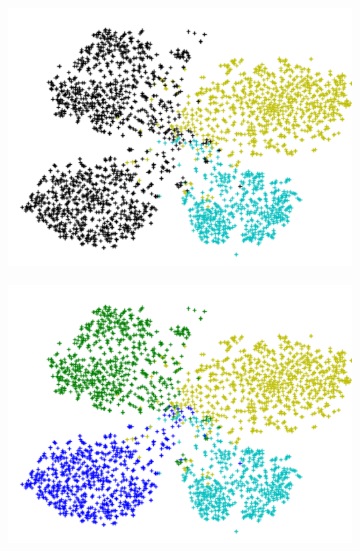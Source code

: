 \begin{figure}[t]
  \centering
  \begin{subfigure}[b]{0.27\linewidth}
    \includegraphics[width=\linewidth]{images/none}
    \caption{}
    \label{fig:null}
  \end{subfigure}
%
  \begin{subfigure}[b]{0.27\linewidth}
    \includegraphics[width=\linewidth]{images/truth}
    \caption{}
    \label{fig:truth}
  \end{subfigure}
%
  \begin{subfigure}[b]{0.27\linewidth}

\end{subfigure}
\end{figure}

